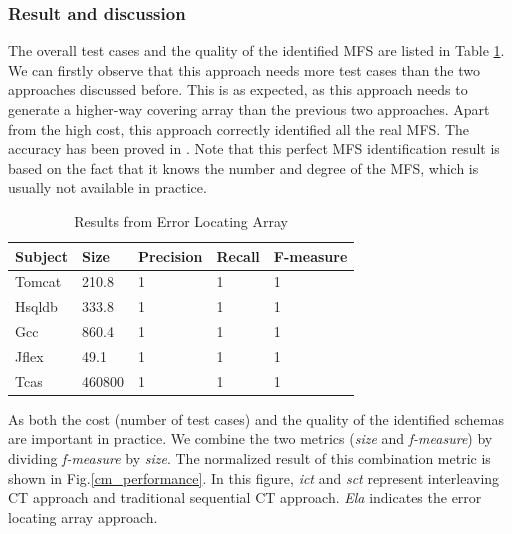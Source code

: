 \documentclass{sig-alternate}
\begin{document}




\subsubsection{Result and discussion}
The overall test cases and the quality of the identified MFS are listed in Table \ref{cm_ela}. We can firstly observe that this approach needs more test cases than the two approaches discussed before. This is as expected, as this approach needs to generate a higher-way covering array than the previous two approaches. Apart from the high cost, this approach correctly identified all the real MFS. The accuracy has been proved in \cite{martinez2008algorithms,martinez2009locating}.  Note that this perfect MFS identification result is based on the fact that it knows the number and degree of the MFS, which is usually not available in practice.


\begin{table}[htbp]
\center
\caption{Results from Error Locating Array}
\label{cm_ela}
\begin{tabular}{|l|llll|}
\hline
Subject & Size   & Precision & Recall & F-measure \\ \hline
Tomcat  & 210.8  & 1       & 1      & 1         \\
Hsqldb  & 333.8  & 1       & 1      & 1         \\
Gcc      & 860.4 & 1       & 1      & 1         \\
Jflex   & 49.1   & 1       & 1      & 1         \\
Tcas    & 460800 & 1       & 1      & 1         \\ \hline
\end{tabular}
\end{table}


As both the cost (number of test cases) and the quality of the identified schemas are important in practice. We combine the two metrics (\emph{size} and \emph{f-measure}) by dividing \emph{f-measure} by \emph{size}. The normalized result of this combination metric is shown in Fig.\ref{cm_performance}. In this figure, \emph{ict} and \emph{sct} represent interleaving CT approach and traditional sequential CT approach. \emph{Ela} indicates the error locating array approach.
\end{document}
